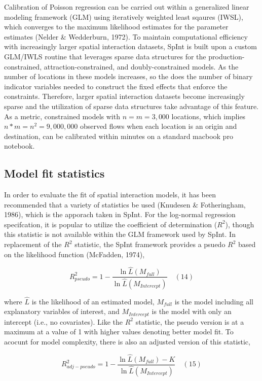 \documentclass[11pt]{article}
\begin{document}
Calibration of Poisson regression can be carried out within a
generalized linear modeling framework (GLM) using iteratively weighted
least sqaures (IWSL), which converges to the maximum likelihood
estimates for the parameter estimates (Nelder \& Wedderburn, 1972). To
maintain computational efficiency with increasingly larger spatial
interaction datasets, SpInt is built upon a custom GLM/IWLS routine that
leverages sparse data structures for the production-constrained,
attraction-constrained, and doubly-constrained models. As the number of
locations in these models increases, so the does the number of binary
indicator variables needed to construct the fixed effects that enforce
the constraints. Therefore, larger spatial interaction datasets become
increasingly sparse and the utilization of sparse data structures take
advantage of this feature. As a metric, constrained models with
\(n = m = 3,000\) locations, which implies \(n*m = n^2 = 9,000,000\)
observed flows when each location is an origin and destination, can be
calibrated within minutes on a standard macbook pro notebook.

    \subsection{Model fit statistics}\label{model-fit-statistics}

    In order to evaluate the fit of spatial interaction models, it has been
recommended that a variety of statistics be used (Knudesen \&
Fotheringham, 1986), which is the apporach taken in SpInt. For the
log-normal regression specifcation, it is popular to utilize the
coefficient of determination (\(R^2\)), though this statistic is not
available within the GLM framework used by SpInt. In replacement of the
\(R^2\) statistic, the SpInt framework provides a psuedo \(R^2\) based
on the likelihood function (McFadden, 1974),

\[R^2_{pseudo} = 1 - \frac{\ln \hat{L}(M_{full})}{\ln \hat{L}(M_{Intercept})} \quad(14)\]

where \(\hat{L}\) is the likelihood of an estimated model, \(M_{full}\)
is the model including all explanatory variables of interest, and
\(M_{Intercept}\) is the model with only an intercept (i.e., no
covariates). Like the \(R^2\) statistic, the pseudo version is at a
maximum at a value of 1 with higher values denoting better model fit. To
acocunt for model complexity, there is also an adjusted version of this
statistic,

\[R^2_{adj-pseudo} = 1 - \frac{\ln \hat{L}(M_{full}) - K}{\ln \hat{L}(M_{Intercept})} \quad(15)\]
\end{document}
